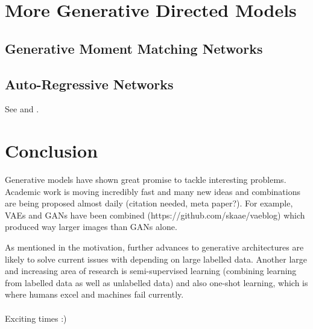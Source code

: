\documentclass[twoside,11pt,a4paper]{article}
\theoremstyle{break}
\begin{document}
\section{More Generative Directed Models}
\label{sec:more}

\subsection{Generative Moment Matching Networks}
\label{sub:more_mmn}

\subsection{Auto-Regressive Networks}
\label{sub:more_arn}

See \cite{gan_openai:2016} and \cite{gan_training:2016}.


\section{Conclusion}
\label{sec:conclusion}

Generative models have shown great promise to tackle interesting problems.
Academic work is moving incredibly fast and many new ideas and combinations
are being proposed almost daily (citation needed, meta paper?).
For example, VAEs and GANs have been combined (https://github.com/skaae/vaeblog)
which produced way larger images than GANs alone.

As mentioned in the motivation, further advances to generative architectures are
likely to solve current issues with depending on large labelled data.
Another large and increasing area of research is semi-supervised learning
(combining learning from labelled data as well as unlabelled data)
and also one-shot learning, which is where humans excel and machines fail currently.
\\\\
Exciting times :)



\end{document}
